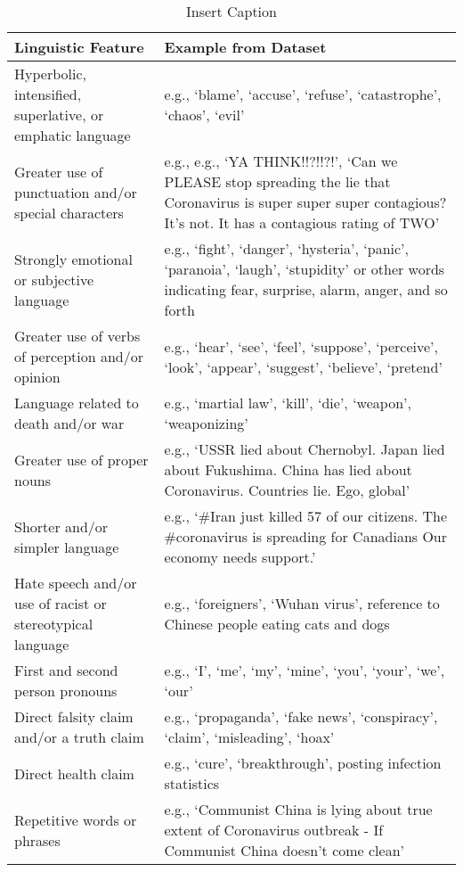 \documentclass{article}
\begin{document}
\begin{table}[htp]
 \caption{Insert Caption}
  \centering
  \begin{tabular}{p{6cm}|p{9cm}}
    \hline
    \textbf{Linguistic Feature} & \textbf{Example from Dataset} \\ [0.5 ex]
    \hline\hline
    Hyperbolic, intensified, superlative, or emphatic language & e.g., ‘blame’, ‘accuse’, ‘refuse’, ‘catastrophe’, ‘chaos’, ‘evil’ \\
    \hline
    Greater use of punctuation and/or special characters & e.g., e.g., ‘YA THINK!!?!!?!’, ‘Can we PLEASE stop spreading the lie that Coronavirus is super super super contagious? It’s not. It has a contagious rating of TWO’ \\
    \hline
    Strongly emotional or subjective language & e.g., ‘fight’, ‘danger’, ‘hysteria’, ‘panic’, ‘paranoia’, ‘laugh’, ‘stupidity’ or other words indicating fear, surprise, alarm, anger, and so forth \\
    \hline
    Greater use of verbs of perception and/or opinion & e.g., ‘hear’, ‘see’, ‘feel’, ‘suppose’, ‘perceive’, ‘look’, ‘appear’, ‘suggest’, ‘believe’, ‘pretend’ \\
    \hline
    Language related to death and/or war & e.g., ‘martial law’, ‘kill’, ‘die’, ‘weapon’, ‘weaponizing’ \\
    \hline
    Greater use of proper nouns & e.g., ‘USSR lied about Chernobyl. Japan lied about Fukushima. China has lied about Coronavirus. Countries lie. Ego, global’ \\
    \hline
    Shorter and/or simpler language & e.g., ‘\#Iran just killed 57 of our citizens. The \#coronavirus is spreading for Canadians Our economy needs support.’ \\
    \hline
    Hate speech and/or use of racist or stereotypical language & e.g., ‘foreigners’, ‘Wuhan virus’, reference to Chinese people eating cats and dogs \\
    \hline
    First and second person pronouns & e.g., ‘I’, ‘me’, ‘my’, ‘mine’, ‘you’, ‘your’, ‘we’, ‘our’ \\
    \hline
    Direct falsity claim and/or a truth claim & e.g., ‘propaganda’, ‘fake news’, ‘conspiracy’, ‘claim’, ‘misleading’, ‘hoax’ \\
    \hline
    Direct health claim & e.g., ‘cure’, ‘breakthrough’, posting infection statistics \\
    \hline
    Repetitive words or phrases & e.g., ‘Communist China is lying about true extent of Coronavirus outbreak - If Communist China doesn’t come clean’ \\

\end{tabular}
\end{table}
\end{document}
